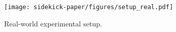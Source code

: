 \begin{figure}[t]
\centering
\texttt{[image: sidekick-paper/figures/setup\_real.pdf]}
\caption{Real-world experimental setup.
}
\label{fig:setup:real}
\end{figure}
